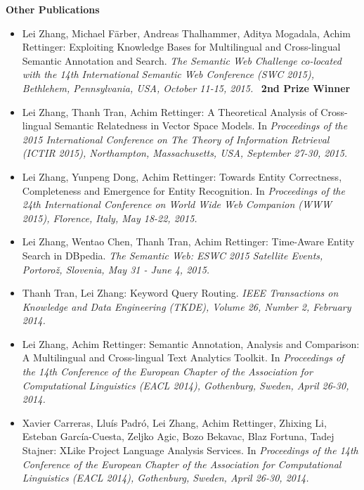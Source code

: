 \forceindent\textbf{Other Publications}
\begin{itemize}
    \item Lei Zhang, Michael Färber, Andreas Thalhammer, Aditya Mogadala, Achim Rettinger: Exploiting Knowledge Bases for Multilingual and Cross-lingual Semantic Annotation and Search. \emph{The Semantic Web Challenge co-located with the 14th International Semantic Web Conference (SWC 2015), Bethlehem, Pennsylvania, USA, October 11-15, 2015.}~\cite{zhang2015swc} 
    \textbf{2nd Prize Winner}
    \item Lei Zhang, Thanh Tran, Achim Rettinger: A Theoretical Analysis of Cross-lingual Semantic Relatedness in Vector Space Models. In \emph{Proceedings of the 2015 International Conference on The Theory of Information Retrieval (ICTIR 2015), Northampton, Massachusetts, USA, September 27-30, 2015.}~\cite{DBLP:conf/ictir/0007TR15}
    \item Lei Zhang, Yunpeng Dong, Achim Rettinger: Towards Entity Correctness, Completeness and Emergence for Entity Recognition. In \emph{Proceedings of the 24th International Conference on World Wide Web Companion (WWW 2015), Florence, Italy, May 18-22, 2015.}~\cite{DBLP:conf/www/ZhangDR15}
    \item Lei Zhang, Wentao Chen, Thanh Tran, Achim Rettinger: Time-Aware Entity Search in DBpedia. \emph{The Semantic Web: ESWC 2015 Satellite Events, Portorož, Slovenia, May 31 - June 4, 2015.}~\cite{DBLP:conf/esws/0034CTR15}
    \item Thanh Tran, Lei Zhang: Keyword Query Routing. \emph{IEEE Transactions on Knowledge and Data Engineering (TKDE), Volume 26, Number 2, February 2014.}~\cite{DBLP:journals/tkde/Tran014}
    \item Lei Zhang, Achim Rettinger: Semantic Annotation, Analysis and Comparison: A Multilingual and Cross-lingual Text Analytics Toolkit. In \emph{Proceedings of the 14th Conference of the European Chapter of the Association for Computational Linguistics (EACL 2014), Gothenburg, Sweden, April 26-30, 2014.}~\cite{DBLP:conf/eacl/ZhangR14}
    \item Xavier Carreras, Lluís Padró, Lei Zhang, Achim Rettinger, Zhixing Li, Esteban García-Cuesta, Zeljko Agic, Bozo Bekavac, Blaz Fortuna, Tadej Stajner: XLike Project Language Analysis Services. In \emph{Proceedings of the 14th Conference of the European Chapter of the Association for Computational Linguistics (EACL 2014), Gothenburg, Sweden, April 26-30, 2014.}~\cite{DBLP:conf/eacl/CarrerasP0RLGABFS14}

\end{itemize}
